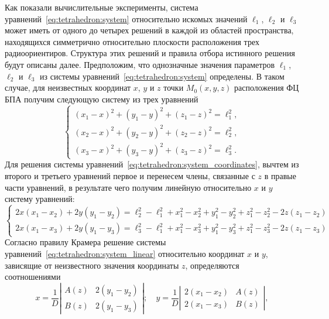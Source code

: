 \documentclass[../main.tex]{subfiles}
\begin{document}
Как показали вычислительные эксперименты, система уравнений~\eqref{eq:tetrahedron:system} относительно искомых значений $\ell_1$, $\ell_2$ и $\ell_3$ может иметь от одного до четырех решений в каждой из областей пространства, находящихся симметрично относительно плоскости расположения трех радиоориентиров. Структура этих решений и правила отбора истинного решения будут описаны далее. Предположим, что однозначные значения параметров $\ell_1$, $\ell_2$ и $\ell_3$ из системы уравнений~\eqref{eq:tetrahedron:system} определены. В таком случае, для неизвестных координат $x$, $y$ и $z$ точки $M_0\left(x, y, z\right)$ расположения ФЦ БПА получим следующую систему из трех уравнений
\begin{equation}\label{eq:tetrahedron:system_coordinates}
    \begin{cases}
        \left(x_1 - x\right)^2 + \left(y_1 - y\right)^2 + \left(z_1 - z\right)^2 = \ell_1^2, \\
        \left(x_2 - x\right)^2 + \left(y_2 - y\right)^2 + \left(z_2 - z\right)^2 = \ell_2^2, \\
        \left(x_3 - x\right)^2 + \left(y_3 - y\right)^2 + \left(z_3 - z\right)^2 = \ell_3^2.
    \end{cases}
\end{equation}
Для решения системы уравнений~\eqref{eq:tetrahedron:system_coordinates}, вычтем из второго и третьего уравнений первое и перенесем члены, связанные с $z$ в правые части уравнений, в результате чего получим линейную относительно $x$ и $y$ систему уравнений:
\begin{equation} \label{eq:tetrahedron:system_linear}
    \begin{cases}
        2x \left(x_1 - x_2\right) + 2 y \left(y_1 - y_2\right) =\ell_2^2 - \ell_1^2 + x_1^2 - x_2^2 + y_1^2 - y_2^2 + z_1^2 - z_2^2 - 2z\left(z_1 - z_2\right) \\
        2x \left(x_1 - x_3\right) + 2 y \left(y_1 - y_3\right) =\ell_3^2 - \ell_1^2 + x_1^2 - x_3^2 + y_1^2 - y_3^2 + z_1^2 - z_3^2 - 2z\left(z_1 - z_3\right)
    \end{cases}
\end{equation}
Согласно правилу Крамера решение системы уравнений~\eqref{eq:tetrahedron:system_linear} относительно координат $x$ и $y$, зависящие от неизвестного значения координаты $z$, определяются соотношениями~\cite{TYRTISHNOKOV:2007}
\begin{equation}\label{eq:tetrahedron:kramer}
  x = \frac{1}{D}\left| \begin{matrix}
    A\left(z\right) & 2 \left(y_1 - y_2\right) \\
    B\left(z\right) & 2 \left(y_1 - y_3\right)
  \end{matrix}\right|;\quad
  y = \frac{1}{D}\left| \begin{matrix}
    2\left(x_1 - x_2\right) & A\left(z\right) \\
    2\left(x_1 - x_3\right) & B\left(z\right)
  \end{matrix}\right|,
\end{equation}
\end{document}

